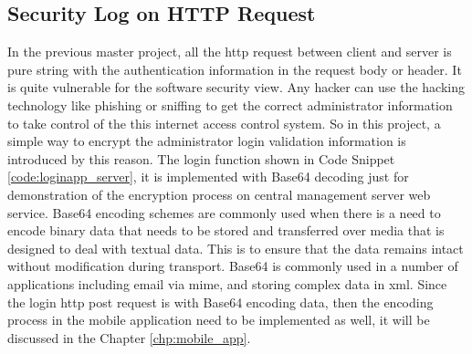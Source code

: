 \subsection{Security Log on HTTP Request}
\par In the previous master project, all the \gls{http} request between client and server is pure string with the authentication information in the request body or header. It is quite vulnerable for the software security view. Any hacker can use the hacking technology like phishing or sniffing to get the correct administrator information to take control of the this internet access control system. So in this project, a simple way to encrypt the administrator login validation information is introduced by this reason. The login function shown in Code Snippet \ref{code:loginapp_server}, it is implemented with Base64\cite{base64} decoding just for demonstration of the encryption process on central management server web service. Base64 encoding schemes are commonly used when there is a need to encode binary data that needs to be stored and transferred over media that is designed to deal with textual data. This is to ensure that the data remains intact without modification during transport. Base64 is commonly used in a number of applications including email via \gls{mime}, and storing complex data in \gls{xml}. Since the login \gls{http} post request is with Base64 encoding data, then the encoding process in the mobile application need to be implemented as well, it will be discussed in the Chapter \ref{chp:mobile_app}.

